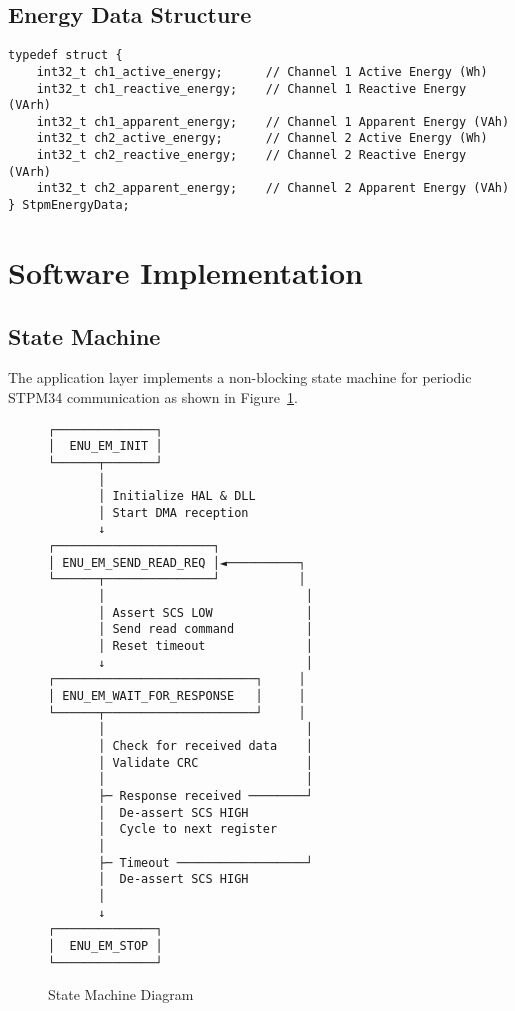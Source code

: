 \documentclass[11pt,a4paper]{article}
\begin{document}
\subsection{Energy Data Structure}

\begin{lstlisting}
typedef struct {
    int32_t ch1_active_energy;      // Channel 1 Active Energy (Wh)
    int32_t ch1_reactive_energy;    // Channel 1 Reactive Energy (VArh)
    int32_t ch1_apparent_energy;    // Channel 1 Apparent Energy (VAh)
    int32_t ch2_active_energy;      // Channel 2 Active Energy (Wh)
    int32_t ch2_reactive_energy;    // Channel 2 Reactive Energy (VArh)
    int32_t ch2_apparent_energy;    // Channel 2 Apparent Energy (VAh)
} StpmEnergyData;
\end{lstlisting}

\section{Software Implementation}

\subsection{State Machine}

The application layer implements a non-blocking state machine for periodic STPM34 communication as shown in Figure~\ref{fig:statemachine}.

\begin{figure}[H]
\centering
\begin{verbatim}
┌──────────────┐
│  ENU_EM_INIT │
└──────┬───────┘
       │
       │ Initialize HAL & DLL
       │ Start DMA reception
       ↓
┌──────────────────────┐
│ ENU_EM_SEND_READ_REQ │◄──────────┐
└──────┬───────────────┘           │
       │                            │
       │ Assert SCS LOW             │
       │ Send read command          │
       │ Reset timeout              │
       ↓                            │
┌────────────────────────────┐     │
│ ENU_EM_WAIT_FOR_RESPONSE   │     │
└──────┬─────────────────────┘     │
       │                            │
       │ Check for received data    │
       │ Validate CRC               │
       │                            │
       ├─ Response received ────────┘
       │  De-assert SCS HIGH
       │  Cycle to next register
       │
       ├─ Timeout ──────────────────┘
       │  De-assert SCS HIGH
       │
       ↓
┌──────────────┐
│  ENU_EM_STOP │
└──────────────┘
\end{verbatim}
\caption{State Machine Diagram}
\label{fig:statemachine}
\end{figure}
\end{document}
